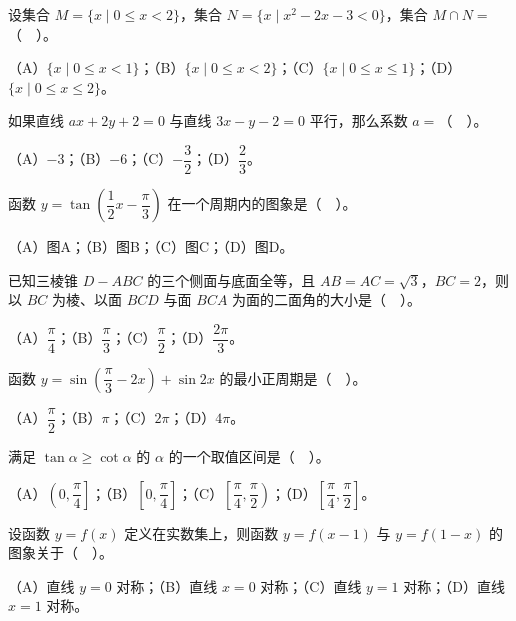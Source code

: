 \begin{question}
设集合 $M=\{x\mid0\le x<2\}$，集合 $N=\{x\mid x^2-2x-3<0\}$，集合 $M\cap N=$（　）。

（A）$\{x\mid0\le x<1\}$；（B）$\{x\mid0\le x<2\}$；（C）$\{x\mid0\le x\le1\}$；（D）$\{x\mid0\le x\le2\}$。

\end{question}
\begin{question}
如果直线 $ax+2y+2=0$ 与直线 $3x-y-2=0$ 平行，那么系数 $a=$（　）。

（A）$-3$；（B）$-6$；（C）$-\dfrac32$；（D）$\dfrac23$。

\Needspace{0.4\textheight}
\end{question}
\begin{question}
函数 $y=\tan\left(\dfrac12x-\dfrac\pi3\right)$ 在一个周期内的图象是（　）。

（A）图A；（B）图B；（C）图C；（D）图D。
\nopagebreak[4]
\begin{center}\end{center}
\nopagebreak[4]
\end{question}
\begin{question}
已知三棱锥 $D-ABC$ 的三个侧面与底面全等，且 $AB=AC=\sqrt3$，$BC=2$，则以 $BC$ 为棱、以面 $BCD$ 与面 $BCA$ 为面的二面角的大小是（　）。

（A）$\dfrac\pi4$；（B）$\dfrac\pi3$；（C）$\dfrac\pi2$；（D）$\dfrac{2\pi}3$。

\end{question}
\begin{question}
函数 $y=\sin\left(\dfrac\pi3-2x\right)+\sin2x$ 的最小正周期是（　）。

（A）$\dfrac\pi2$；（B）$\pi$；（C）$2\pi$；（D）$4\pi$。

\end{question}
\begin{question}
满足 $\tan\alpha\ge\cot\alpha$ 的 $\alpha$ 的一个取值区间是（　）。

（A）$\left(0,\dfrac\pi4\right]$；（B）$\left[0,\dfrac\pi4\right]$；（C）$\left[\dfrac\pi4,\dfrac\pi2\right)$；（D）$\left[\dfrac\pi4,\dfrac\pi2\right]$。

\end{question}
\begin{question}
设函数 $y=f(x)$ 定义在实数集上，则函数 $y=f(x-1)$ 与 $y=f(1-x)$ 的图象关于（　）。

（A）直线 $y=0$ 对称；（B）直线 $x=0$ 对称；（C）直线 $y=1$ 对称；（D）直线 $x=1$ 对称。

\end{question}

